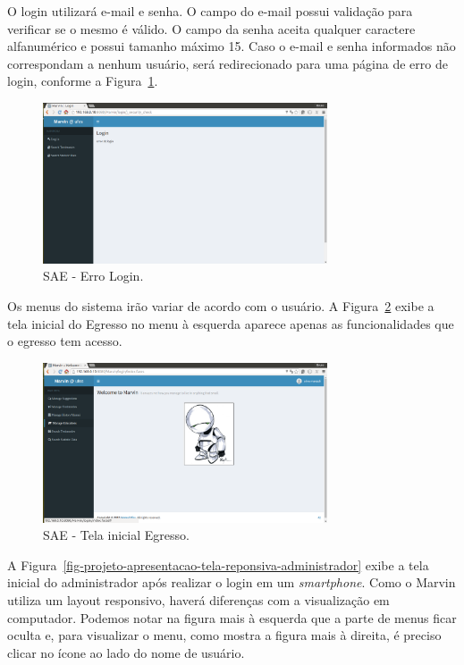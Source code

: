 O login utilizará e-mail e senha. O campo do e-mail possui validação para verificar se o mesmo é válido. O campo da senha aceita qualquer caractere alfanumérico e possui tamanho máximo 15. Caso o e-mail e senha informados não correspondam a nenhum usuário, será redirecionado para uma página de erro de login, conforme a Figura~\ref{fig-projeto-apresentacao-login-erro}.

\begin{figure}[h]
	\centering
	\includegraphics[width=0.75\textwidth]{figuras/projeto/fig-projeto-apresentacao-login-erro}
	\caption{SAE - Erro Login.}
	\label{fig-projeto-apresentacao-login-erro}
\end{figure}



Os menus do sistema irão variar de acordo com o usuário. A Figura~\ref{fig-projeto-tela-inicial-egresso} exibe a tela inicial do Egresso no menu à esquerda aparece apenas as funcionalidades que o egresso tem acesso.

\begin{figure}[h]
	\centering
	\includegraphics[width=0.75\textwidth]{figuras/projeto/fig-projeto-apresentacao-tela-inicial-egresso}
	\caption{SAE - Tela inicial Egresso.}
	\label{fig-projeto-tela-inicial-egresso}
\end{figure}


A Figura~\ref{fig-projeto-apresentacao-tela-reponsiva-administrador} exibe a tela inicial do administrador após realizar o login em um \textit{smartphone}. Como o Marvin utiliza um layout responsivo, haverá diferenças com a visualização em computador. Podemos notar na figura mais à esquerda que a parte de menus ficar oculta e, para visualizar o menu, como mostra a figura mais à direita, é preciso clicar no ícone ao lado do nome de usuário.


